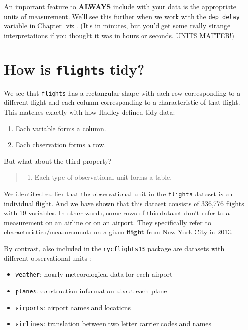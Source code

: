 \documentclass[]{tufte-book}
\providecommand{\tightlist}{%
  \setlength{\itemsep}{0pt}\setlength{\parskip}{0pt}}
\begin{document}
An important feature to \textbf{ALWAYS} include with your data is the
appropriate units of measurement. We'll see this further when we work
with the \texttt{dep\_delay} variable in Chapter \ref{viz}. (It's in
minutes, but you'd get some really strange interpretations if you
thought it was in hours or seconds. UNITS MATTER!)

\section{\texorpdfstring{How is \texttt{flights}
tidy?}{How is flights tidy?}}\label{how-is-flights-tidy}

We see that \texttt{flights} has a rectangular shape with each row
corresponding to a different flight and each column corresponding to a
characteristic of that flight. This matches exactly with how Hadley
defined tidy data:

\begin{enumerate}
\def\labelenumi{\arabic{enumi}.}
\tightlist
\item
  Each variable forms a column.
\item
  Each observation forms a row.
\end{enumerate}

But what about the third property?

\begin{quote}
\begin{enumerate}
\def\labelenumi{\arabic{enumi}.}
\setcounter{enumi}{2}
\tightlist
\item
  Each type of observational unit forms a table.
\end{enumerate}
\end{quote}

We identified earlier that the observational unit in the
\texttt{flights} dataset is an individual flight. And we have shown that
this dataset consists of 336,776 flights with 19 variables. In other
words, some rows of this dataset don't refer to a measurement on an
airline or on an airport. They specifically refer to
characteristics/measurements on a given \textbf{flight} from New York
City in 2013.

By contrast, also included in the \texttt{nycflights13} package are
datasets with different observational units \citep{R-nycflights13}:

\begin{itemize}
\tightlist
\item
  \texttt{weather}: hourly meteorological data for each airport
\item
  \texttt{planes}: construction information about each plane
\item
  \texttt{airports}: airport names and locations
\item
  \texttt{airlines}: translation between two letter carrier codes and
  names
\end{itemize}
\end{document}
